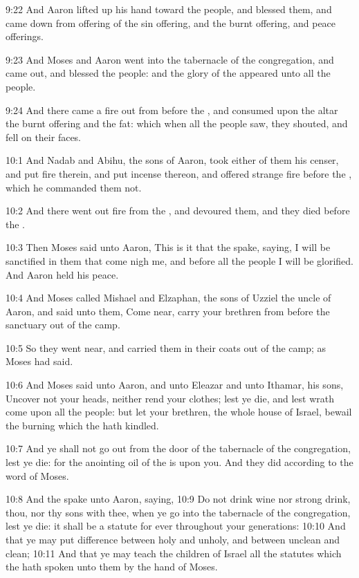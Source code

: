 9:22 And Aaron lifted up his hand toward the people, and blessed them, and came down from offering of the sin offering, and the burnt offering, and peace offerings.

9:23 And Moses and Aaron went into the tabernacle of the congregation, and came out, and blessed the people: and the glory of the \LORD appeared unto all the people.

9:24 And there came a fire out from before the \LORD, and consumed upon the altar the burnt offering and the fat: which when all the people saw, they shouted, and fell on their faces.

10:1 And Nadab and Abihu, the sons of Aaron, took either of them his censer, and put fire therein, and put incense thereon, and offered strange fire before the \LORD, which he commanded them not.

10:2 And there went out fire from the \LORD, and devoured them, and they died before the \LORD.

10:3 Then Moses said unto Aaron, This is it that the \LORD spake, saying, I will be sanctified in them that come nigh me, and before all the people I will be glorified. And Aaron held his peace.

10:4 And Moses called Mishael and Elzaphan, the sons of Uzziel the uncle of Aaron, and said unto them, Come near, carry your brethren from before the sanctuary out of the camp.

10:5 So they went near, and carried them in their coats out of the camp; as Moses had said.

10:6 And Moses said unto Aaron, and unto Eleazar and unto Ithamar, his sons, Uncover not your heads, neither rend your clothes; lest ye die, and lest wrath come upon all the people: but let your brethren, the whole house of Israel, bewail the burning which the \LORD hath kindled.

10:7 And ye shall not go out from the door of the tabernacle of the congregation, lest ye die: for the anointing oil of the \LORD is upon you. And they did according to the word of Moses.

10:8 And the \LORD spake unto Aaron, saying, 10:9 Do not drink wine nor strong drink, thou, nor thy sons with thee, when ye go into the tabernacle of the congregation, lest ye die: it shall be a statute for ever throughout your generations: 10:10 And that ye may put difference between holy and unholy, and between unclean and clean; 10:11 And that ye may teach the children of Israel all the statutes which the \LORD hath spoken unto them by the hand of Moses.


